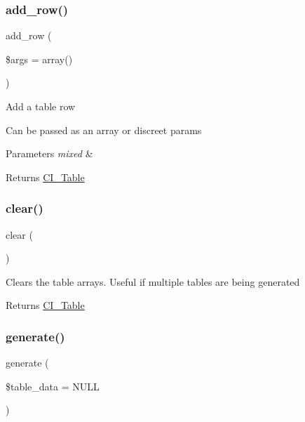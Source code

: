 \subsubsection{\texorpdfstring{add\+\_\+row()}{add\_row()}}
{\footnotesize\ttfamily add\+\_\+row (\begin{DoxyParamCaption}\item[{}]{\$args = {\ttfamily array()} }\end{DoxyParamCaption})}

Add a table row

Can be passed as an array or discreet params


\begin{DoxyParams}{Parameters}
{\em mixed} & \\
\hline
\end{DoxyParams}
\begin{DoxyReturn}{Returns}
\mbox{\hyperlink{class_c_i___table}{C\+I\+\_\+\+Table}} 
\end{DoxyReturn}
\mbox{\label{class_c_i___table_aa821bec12eaa7e0f649397c9675ff505}} 
\subsubsection{\texorpdfstring{clear()}{clear()}}
{\footnotesize\ttfamily clear (\begin{DoxyParamCaption}{ }\end{DoxyParamCaption})}

Clears the table arrays. Useful if multiple tables are being generated

\begin{DoxyReturn}{Returns}
\mbox{\hyperlink{class_c_i___table}{C\+I\+\_\+\+Table}} 
\end{DoxyReturn}
\mbox{\label{class_c_i___table_ad46f79939e16f261c19157809d56aab8}} 
\subsubsection{\texorpdfstring{generate()}{generate()}}
{\footnotesize\ttfamily generate (\begin{DoxyParamCaption}\item[{}]{\$table\+\_\+data = {\ttfamily NULL} }\end{DoxyParamCaption})}

